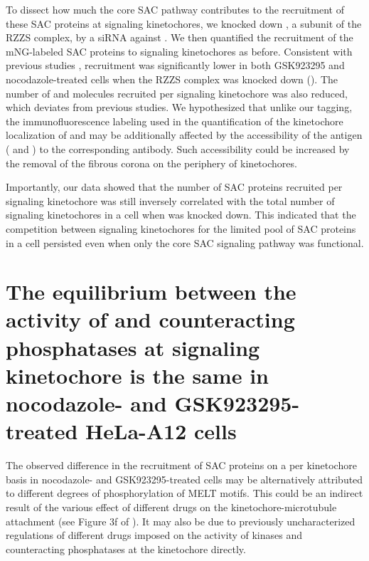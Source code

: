 To dissect how much the core SAC pathway contributes to the recruitment of these SAC proteins at signaling kinetochores, we knocked down , a subunit of the RZZS complex, by a siRNA against . We then quantified the recruitment of the mNG-labeled SAC proteins to signaling kinetochores as before. Consistent with previous studies \cite{CENPELocalization-BUBR1,siROD_Zhang2019},  recruitment was significantly lower in both GSK923295 and nocodazole-treated cells when the RZZS complex was knocked down (). The number of  and  molecules recruited per signaling kinetochore was also reduced, which deviates from previous studies. We hypothesized that unlike our  tagging, the immunofluorescence labeling used in the quantification of the kinetochore localization of  and  \cite{BUBR1_XenopusVSHeLa,siROD_Zhang2019} may be additionally affected by the accessibility of the antigen ( and ) to the corresponding antibody. Such accessibility could be increased by the removal of the fibrous corona on the periphery of kinetochores.

Importantly, our data showed that the number of SAC proteins recruited per signaling kinetochore was still inversely correlated with the total number of signaling kinetochores in a cell when  was knocked down. This indicated that the competition between signaling kinetochores for the limited pool of SAC proteins in a cell persisted even when only the core SAC signaling pathway was functional.

\section{The equilibrium between the activity of  and counteracting phosphatases at signaling kinetochore is the same in nocodazole- and GSK923295-treated HeLa-A12 cells}
\label{MPS1sen-KTSection}

The observed difference in the recruitment of SAC proteins on a per kinetochore basis in nocodazole- and GSK923295-treated cells may be alternatively attributed to different degrees of phosphorylation of MELT motifs. This could be an indirect result of the various effect of different drugs on the kinetochore-microtubule attachment (see Figure 3f of \cite{Rheostat}). It may also be due to previously uncharacterized regulations of different drugs imposed on the activity of kinases and counteracting phosphatases at the kinetochore directly.

